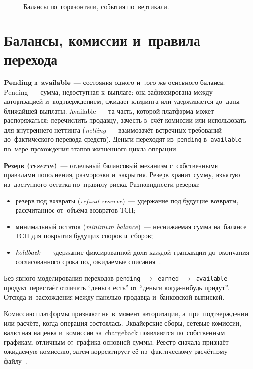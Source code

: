\begin{figure}[tbp]
  \centering
  \caption{Балансы по~горизонтали, события по~вертикали.}%
  \label{fig:balance-event-grid}
\end{figure}

\section{Балансы, комиссии и~правила перехода}\label{sec:ledger-balances}

\textbf{Pending} и~\textbf{available}~--- состояния одного и~того же основного
баланса. Pending~--- сумма, недоступная к~выплате: она зафиксирована между
авторизацией и~подтверждением, ожидает клиринга или удерживается до~даты
ближайшей выплаты. Available~--- та часть, которой платформа может
распоряжаться: перечислить продавцу, зачесть в~счёт комиссии или использовать
для внутреннего неттинга (\textit{netting}~--- взаимозачёт встречных требований
до~фактического перевода средств). Деньги переходят из~\texttt{pending} в~\texttt{available}
по~мере прохождения этапов жизненного цикла
операции~\cite{stripe-balances,adyen-balances}.

\textbf{Резерв (\textit{reserve})}~--- отдельный балансовый механизм
с~собственными правилами пополнения, разморозки и~закрытия. Резерв хранит
сумму, изъятую из~доступного остатка по~правилу риска. Разновидности резерва:
\begin{itemize}
  \item резерв под возвраты (\textit{refund reserve})~--- удержание под будущие
    возвраты, рассчитанное от~объёма возвратов ТСП;
  \item минимальный остаток (\textit{minimum balance})~--- неснижаемая сумма
    на~балансе ТСП для покрытия будущих споров и~сборов;
  \item \textit{holdback}~--- удержание фиксированной доли каждой транзакции
    до~окончания согласованного срока под ожидаемые
    списания~\cite{stripe-balances,stripe-minimum-balances,adyen-balances}.
\end{itemize}

Без явного моделирования переходов \texttt{pending}~$\to$~\texttt{earned}~$\to$~\texttt{available} продукт
перестаёт отличать \enquote{деньги есть} от \enquote{деньги когда-нибудь
придут}. Отсюда и~расхождения между панелью продавца и~банковской выпиской.

Комиссию платформы признают не~в~момент авторизации, а~при~подтверждении или
расчёте, когда операция состоялась. Эквайерские сборы, сетевые комиссии, валютная
наценка и~комиссии за~chargeback появляются по~собственным графикам, отличным
от~графика основной суммы. Реестр сначала признаёт ожидаемую комиссию, затем корректирует её по~фактическому расчётному
файлу~\cite{visa-core-rules,mc-tpr,stripe-balances}.

